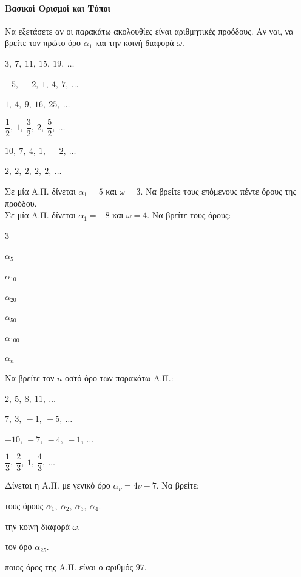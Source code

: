 \documentclass[11pt,a4paper,modern]{FFExercises}
\begin{document}

\paragraph{Βασικοί Ορισμοί και Τύποι}

\askhsh Να εξετάσετε αν οι παρακάτω ακολουθίες είναι αριθμητικές προόδους. Αν ναι, να βρείτε τον πρώτο όρο $\alpha_1$ και την κοινή διαφορά $\omega$.
\begin{alist}
\item $3,\ 7,\ 11,\ 15,\ 19,\ \ldots$
\item $-5,\ -2,\ 1,\ 4,\ 7,\ \ldots$
\item $1,\ 4,\ 9,\ 16,\ 25,\ \ldots$
\item $\dfrac{1}{2},\ 1,\ \dfrac{3}{2},\ 2,\ \dfrac{5}{2},\ \ldots$
\item $10,\ 7,\ 4,\ 1,\ -2,\ \ldots$
\item $2,\ 2,\ 2,\ 2,\ 2,\ \ldots$
\end{alist}

\askhsh Σε μία Α.Π. δίνεται $\alpha_1=5$ και $\omega=3$. Να βρείτε τους επόμενους πέντε όρους της προόδου.\\

\askhsh Σε μία Α.Π. δίνεται $\alpha_1=-8$ και $\omega=4$. Να βρείτε τους όρους:
\begin{multicols}{3}
\begin{alist}
\item $\alpha_5$
\item $\alpha_{10}$
\item $\alpha_{20}$
\item $\alpha_{50}$
\item $\alpha_{100}$
\item $\alpha_{n}$
\end{alist}
\end{multicols}

\askhsh Να βρείτε τον $n$-οστό όρο των παρακάτω Α.Π.:
\begin{alist}
\item $2,\ 5,\ 8,\ 11,\ \ldots$
\item $7,\ 3,\ -1,\ -5,\ \ldots$
\item $-10,\ -7,\ -4,\ -1,\ \ldots$
\item $\dfrac{1}{3},\ \dfrac{2}{3},\ 1,\ \dfrac{4}{3},\ \ldots$ 
\end{alist}

\askhsh Δίνεται η Α.Π. με γενικό όρο $\alpha_{\nu}=4\nu-7$. Να βρείτε:
\begin{alist}
\item τους όρους $\alpha_1,\ \alpha_2,\ \alpha_3,\ \alpha_4$.
\item την κοινή διαφορά $\omega$.
\item τον όρο $\alpha_{25}$.
\item ποιος όρος της Α.Π. είναι ο αριθμός $97$.
\end{alist}
\end{document}
